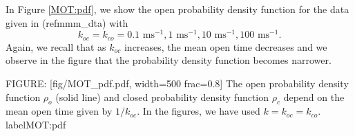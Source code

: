 In Figure \ref{MOT:pdf}, we show the open probability density function for the data given
in (ref{mmm_dta}) with
\[
k_{oc}=k_{co}=0.1 \text{ ms}^{-1},1\text{ ms}^{-1},10\text{ ms}^{-1},100 \text{ ms}^{-1}.
\]
Again, we recall that as $k_{oc}$ increases, the mean open time
decreases and we observe in the figure that the probability density function
becomes narrower.

FIGURE: [fig/MOT_pdf.pdf, width=500 frac=0.8] The open probability density function $\rho_o$ (solid line) and closed
 probability density function $\rho_c$ depend on the mean open time given by $1/k_{oc}$. In the figures,
 we have used $k=k_{oc}=k_{co}.$ label{MOT:pdf}\bigskip

\begin{comment}
\subsection{The limit of the zero mean open time}


\end{comment}
